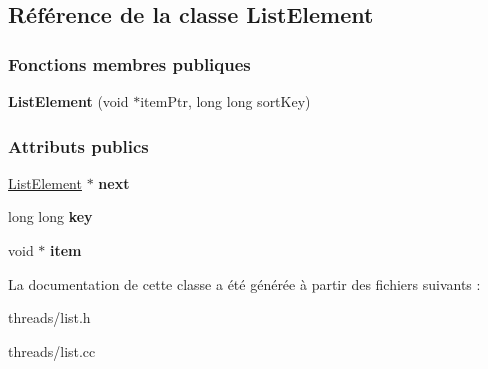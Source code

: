 \hypertarget{class_list_element}{}\subsection{Référence de la classe List\+Element}
\label{class_list_element}
\subsubsection*{Fonctions membres publiques}
\begin{DoxyCompactItemize}
\item 
\hypertarget{class_list_element_a1c8d6f93347462ddc05ad0465377ba1e}{}\label{class_list_element_a1c8d6f93347462ddc05ad0465377ba1e} 
{\bfseries List\+Element} (void $\ast$item\+Ptr, long long sort\+Key)
\end{DoxyCompactItemize}
\subsubsection*{Attributs publics}
\begin{DoxyCompactItemize}
\item 
\hypertarget{class_list_element_aa8c417b2eb8a7b1e84dd9a2306624e61}{}\label{class_list_element_aa8c417b2eb8a7b1e84dd9a2306624e61} 
\hyperlink{class_list_element}{List\+Element} $\ast$ {\bfseries next}
\item 
\hypertarget{class_list_element_a582785cee7d64d9397b7977e56c0185a}{}\label{class_list_element_a582785cee7d64d9397b7977e56c0185a} 
long long {\bfseries key}
\item 
\hypertarget{class_list_element_ae138c41c51b6082a7b68db132f679e1e}{}\label{class_list_element_ae138c41c51b6082a7b68db132f679e1e} 
void $\ast$ {\bfseries item}
\end{DoxyCompactItemize}


La documentation de cette classe a été générée à partir des fichiers suivants \+:\begin{DoxyCompactItemize}
\item 
threads/list.\+h\item 
threads/list.\+cc\end{DoxyCompactItemize}

